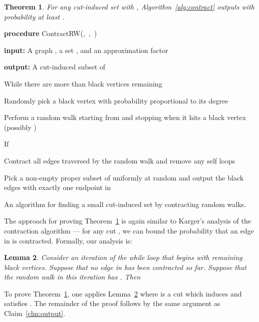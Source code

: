 \documentclass[11pt]{article}
\numberwithin{equation}{section}
\newenvironment{alg}{
    \begin{list}{}{
        \setlength{\itemsep}{2pt}
        \setlength{\parsep}{0pt}
        \setlength{\parskip}{0pt}
        \setlength{\topsep}{1pt}
    }
}
{
    \end{list}
}
\newtheorem{theorem}{Theorem}[section]
\newtheorem{lemma}[theorem]{Lemma}
\newcommand{\AlgorithmName}[1]{\label{alg:#1}}
\newcommand{\Algorithm}[1]{Algorithm~\ref{alg:#1}}
\newcommand{\Claim}[1]{Claim~\ref{clm:#1}}
\newcommand{\LemmaName}[1]{\label{lem:#1}}
\newcommand{\Lemma}[1]{Lemma~\ref{lem:#1}}
\newcommand{\TheoremName}[1]{\label{thm:#1}}
\newcommand{\Theorem}[1]{Theorem~\ref{thm:#1}}
\begin{document}
\begin{theorem}
\TheoremName{contract_with_RW}
For any cut-induced set  with ,
\Algorithm{contract} outputs  with probability at least .
\end{theorem}


\begin{algorithm}
\begin{alg}
    \item	\textbf{procedure} ContractRW(,\, ,\, )
    \item	\textbf{input:} A graph , a set ,
            and an approximation factor 
    \item	\textbf{output:} A cut-induced subset of 
	\item	While there are more than  black vertices remaining
	\begin{alg}
        \item	Randomly pick a black vertex  with probability proportional to its degree
\item	Perform a random walk starting from  and
                stopping when it hits a black vertex  (possibly )
        \item   If 
        \begin{alg}
            \item	Contract all edges traversed by the random walk and remove any self loops
        \end{alg}
    \end{alg}
	\item	Pick a non-empty proper subset  of  uniformly at random
	        and output the black edges with exactly one endpoint in 
\end{alg}
\caption{An algorithm for finding a small cut-induced set by contracting random walks.}
\AlgorithmName{contractRW}
\end{algorithm}

The approach for proving \Theorem{contract_with_RW}
is again similar to Karger's analysis of the contraction algorithm
--- for any cut , we can bound the probability that an edge in  is contracted. 
Formally, our analysis is:

\begin{lemma}
\LemmaName{rw}
Consider an iteration of the while loop that begins with  remaining black vertices.
Suppose that no edge in  has been contracted so far.
Suppose that the random walk in this iteration has .
Then

\end{lemma}

To prove \Theorem{contract_with_RW}, one applies \Lemma{rw}
where  is a cut which induces  and satisfies .
The remainder of the proof follows by the same argument as \Claim{output}.
\end{document}
